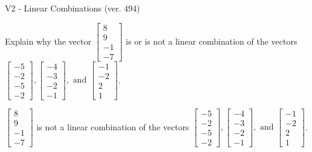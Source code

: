 \begin{exercise}
  \begin{exerciseTitle}V2 - Linear Combinations (ver. 494)\end{exerciseTitle}
  \begin{exerciseStatement}
    Explain why the vector \(\left[\begin{array}{c}
8 \\
9 \\
-1 \\
-7
\end{array}\right]\)  is or is not a linear 
	combination of the vectors \(\left[\begin{array}{c}
-5 \\
-2 \\
-5 \\
-2
\end{array}\right] , \left[\begin{array}{c}
-4 \\
-3 \\
-2 \\
-1
\end{array}\right] , \text{ and } \left[\begin{array}{c}
-1 \\
-2 \\
2 \\
1
\end{array}\right]\).
	


  \end{exerciseStatement}
  \begin{exerciseAnswer}
   \(\left[\begin{array}{c}
8 \\
9 \\
-1 \\
-7
\end{array}\right]\) 
  	 is not  
	a linear combination of the vectors \(\left[\begin{array}{c}
-5 \\
-2 \\
-5 \\
-2
\end{array}\right] , \left[\begin{array}{c}
-4 \\
-3 \\
-2 \\
-1
\end{array}\right] , \text{ and } \left[\begin{array}{c}
-1 \\
-2 \\
2 \\
1
\end{array}\right]\).

	
  


  \end{exerciseAnswer}
\end{exercise}